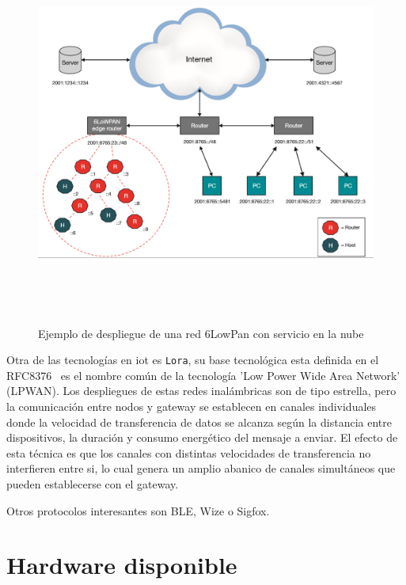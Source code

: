 \begin{figure}[hbt!]
\centering
\label{6Lowpandeploy}
\includegraphics[height=5in]{figures/6LowPanDeploy.png}
\caption[Ejemplo de despliegue de una red 6LowPan con servicio en la nube]{Ejemplo de despliegue de una red 6LowPan con servicio en la nube}
\end{figure}

Otra de las tecnologías en {iot} es \verb|Lora|, su base tecnológica esta definida en el RFC8376~\cite{rfc8376} es el nombre común de la tecnología 'Low Power Wide Area Network' (LPWAN). Los despliegues de estas redes inalámbricas son de tipo estrella, pero la comunicación entre nodos y \gls{gateway} se establecen en canales individuales donde la velocidad de transferencia de datos se alcanza según la distancia entre dispositivos, la duración y consumo energético del mensaje a enviar. El efecto de esta técnica es que los canales con distintas velocidades de transferencia no interfieren entre si, lo cual genera un amplio abanico de canales simultáneos que pueden establecerse con el \gls{gateway}.

Otros protocolos interesantes son BLE, Wize o Sigfox.


\section{Hardware disponible}
\label{ch:Capitulo2.4}


